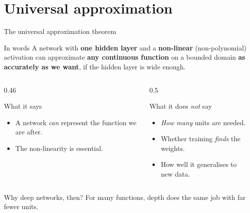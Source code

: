 \documentclass[10pt,aspectratio=169]{beamer}
\begin{document}

\section{Universal approximation}

\begin{frame}{The universal approximation theorem}
\begin{block}{In words}
A network with \textbf{one hidden layer} and a \textbf{non-linear}
(non-polynomial) activation can approximate \textbf{any continuous
function} on a bounded domain \textbf{as accurately as we want}, if the
hidden layer is wide enough.
\end{block}
\vspace{6pt}
\begin{columns}[T]
\begin{column}{0.46\textwidth}
\begin{block}{What it says}
\begin{itemize}
  \item A network \emph{can} represent the function we are after.
  \item The non-linearity is essential.
\end{itemize}
\end{block}
\end{column}
\begin{column}{0.5\textwidth}
\begin{block}{What it does \emph{not} say}
\begin{itemize}
  \item \emph{How many} units are needed.
  \item Whether training \emph{finds} the weights.
  \item How well it generalises to new data.
\end{itemize}
\end{block}
\end{column}
\end{columns}
\vspace{4pt}
\small Why deep networks, then?  For many functions, depth does the same
job with far fewer units.
\end{frame}
\end{document}
